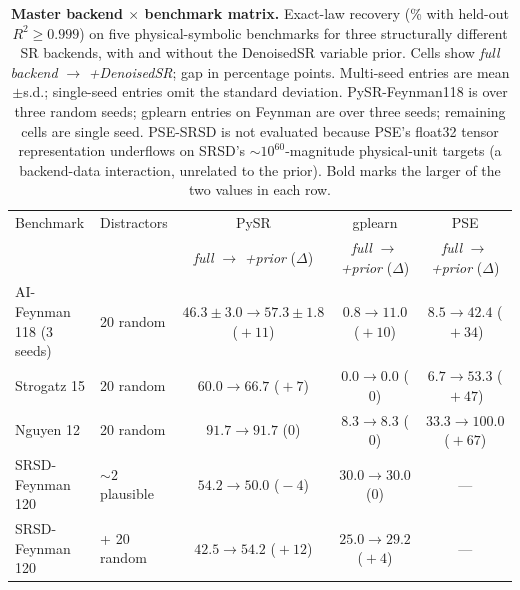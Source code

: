 \documentclass[11pt]{article}
\begin{document}
\begin{table}[h!]\centering
\caption{\textbf{Master backend $\times$ benchmark matrix.} Exact-law recovery
(\% with held-out $R^2 \ge 0.999$) on five physical-symbolic benchmarks for
three structurally different SR backends, with and without the DenoisedSR
variable prior. Cells show \emph{full backend} $\to$ \emph{+DenoisedSR}; gap in
percentage points. Multi-seed entries are mean$\pm$s.d.; single-seed entries
omit the standard deviation. PySR-Feynman118 is over three random seeds;
gplearn entries on Feynman are over three seeds; remaining cells are single
seed. PSE-SRSD is not evaluated because PSE's float32 tensor representation
underflows on SRSD's $\sim 10^{60}$-magnitude physical-unit targets (a
backend-data interaction, unrelated to the prior). Bold marks the larger of
the two values in each row.}
\label{tab:backends-3way}
\scriptsize
\setlength{\tabcolsep}{4pt}
\begin{tabular}{llccc}
\toprule
Benchmark & Distractors & PySR & gplearn & PSE \\
          &             & \emph{full} $\to$ \emph{+prior} ($\Delta$) & \emph{full} $\to$ \emph{+prior} ($\Delta$) & \emph{full} $\to$ \emph{+prior} ($\Delta$) \\
\midrule
AI-Feynman 118 (3 seeds)  & 20 random      & $46.3{\pm}3.0 \to \mathbf{57.3{\pm}1.8}$ ($\!+\!11$) & $0.8 \to \mathbf{11.0}$ ($\!+\!10$) & $8.5 \to \mathbf{42.4}$ ($\!+\!34$) \\
Strogatz 15                & 20 random      & $60.0 \to \mathbf{66.7}$ ($\!+\!7$)  & $0.0 \to 0.0$ ($0$)         & $6.7 \to \mathbf{53.3}$ ($\!+\!47$) \\
Nguyen 12                  & 20 random      & $\mathbf{91.7} \to \mathbf{91.7}$ ($0$) & $8.3 \to 8.3$ ($0$) & $33.3 \to \mathbf{100.0}$ ($\!+\!67$) \\
SRSD-Feynman 120           & ${\sim}2$ plausible & $\mathbf{54.2} \to 50.0$ ($\!-\!4$) & $30.0 \to 30.0$ ($0$) & --- \\
SRSD-Feynman 120           & + 20 random    & $42.5 \to \mathbf{54.2}$ ($\!+\!12$) & $25.0 \to \mathbf{29.2}$ ($\!+\!4$) & --- \\
\bottomrule
\end{tabular}
\end{table}
\end{document}
